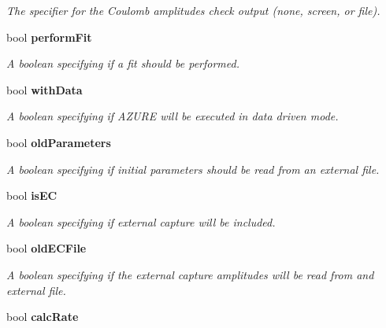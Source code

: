 \begin{CompactItemize}
\begin{CompactList}\small\item\em The specifier for the Coulomb amplitudes check output (none, screen, or file). \item\end{CompactList}\item 
bool \bf{perform\-Fit}\label{structConfig_c1c5f7fd069e0739f3033b2e72a9af12}

\begin{CompactList}\small\item\em A boolean specifying if a fit should be performed. \item\end{CompactList}\item 
bool \bf{with\-Data}\label{structConfig_30bd25d4db7888eb513863703c0d090e}

\begin{CompactList}\small\item\em A boolean specifying if AZURE will be executed in data driven mode. \item\end{CompactList}\item 
bool \bf{old\-Parameters}\label{structConfig_9c07a2cd66a0e76b330d3ce21f7d03f1}

\begin{CompactList}\small\item\em A boolean specifying if initial parameters should be read from an external file. \item\end{CompactList}\item 
bool \bf{is\-EC}\label{structConfig_ded13b3cfe22fb5ef97c16e7d6b21e79}

\begin{CompactList}\small\item\em A boolean specifying if external capture will be included. \item\end{CompactList}\item 
bool \bf{old\-ECFile}\label{structConfig_64b2073e49312bd269ed6290764d92d2}

\begin{CompactList}\small\item\em A boolean specifying if the external capture amplitudes will be read from and external file. \item\end{CompactList}\item 
bool \bf{calc\-Rate}\label{structConfig_6f2837648252bdb0c92a2c4bcb365bc0}


\end{CompactItemize}
